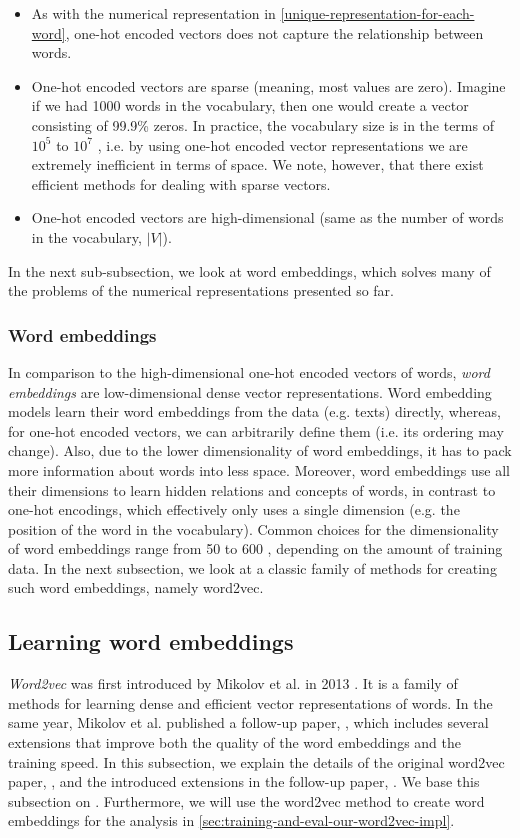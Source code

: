 \begin{itemize}
    \item As with the numerical representation in \cref{unique-representation-for-each-word}, one-hot encoded vectors does not capture the relationship between words.
    \item One-hot encoded vectors are sparse (meaning, most values are zero). Imagine if we had 1000 words in the vocabulary, then one would create a vector consisting of 99.9\% zeros. In practice, the vocabulary size is in the terms of $10^5$ to $10^7$ \cite{mikolov2013b}, i.e. by using one-hot encoded vector representations we are extremely inefficient in terms of space. We note, however, that there exist efficient methods for dealing with sparse vectors.
    \item One-hot encoded vectors are high-dimensional (same as the number of words in the vocabulary, $|V|$).
\end{itemize}
In the next sub-subsection, we look at word embeddings, which solves many of the problems of the numerical representations presented so far.

\subsubsection{Word embeddings}
In comparison to the high-dimensional one-hot encoded vectors of words, \textit{word embeddings} are low-dimensional dense vector representations. Word embedding models learn their word embeddings from the data (e.g. texts) directly, whereas, for one-hot encoded vectors, we can arbitrarily define them (i.e. its ordering may change). Also, due to the lower dimensionality of word embeddings, it has to pack more information about words into less space. Moreover, word embeddings use all their dimensions to learn hidden relations and concepts of words, in contrast to one-hot encodings, which effectively only uses a single dimension (e.g. the position of the word in the vocabulary). Common choices for the dimensionality of word embeddings range from 50 to 600 \cite{mikolov2013a}, depending on the amount of training data. In the next subsection, we look at a classic family of methods for creating such word embeddings, namely word2vec.

\subsection{Learning word embeddings}
\label{sec:word2vec}
\textit{Word2vec} was first introduced by Mikolov et al. in 2013 \cite{mikolov2013a}. It is a family of methods for learning dense and efficient vector representations of words. In the same year, Mikolov et al. published a follow-up paper, \cite{mikolov2013b}, which includes several extensions that improve both the quality of the word embeddings and the training speed. In this subsection, we explain the details of the original word2vec paper, \cite{mikolov2013a}, and the introduced extensions in the follow-up paper, \cite{mikolov2013b}. We base this subsection on \cite{mikolov2013a,mikolov2013b}. Furthermore, we will use the word2vec method to create word embeddings for the analysis in \cref{sec:training-and-eval-our-word2vec-impl}.

